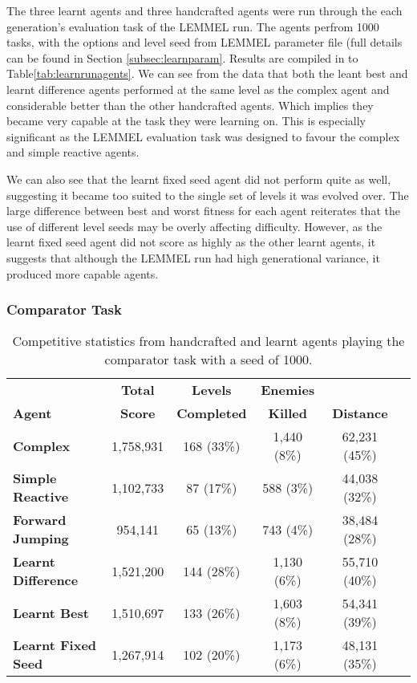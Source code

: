 The three learnt agents and three handcrafted agents were run through the each generation's evaluation task of the LEMMEL run. The agents perfrom 1000 tasks, with the options and level seed from LEMMEL parameter file (full details can be found in Section \ref{subsec:learnparam}. Results are compiled in to Table\ref{tab:learnrunagents}. We can see from the data that both the leant best and learnt difference agents performed at the same level as the complex agent and considerable better than the other handcrafted agents. Which implies they became very capable at the task they were learning on. This is especially significant as the LEMMEL evaluation task was designed to favour the complex and simple reactive agents.

We can also see that the learnt fixed seed agent did not perform quite as well, suggesting it became too suited to the single set of levels it was evolved over. The large difference between best and worst fitness for each agent reiterates that the use of different level seeds may be overly affecting difficulty. However, as the learnt fixed seed agent did not score as highly as the other learnt agents, it suggests that although the LEMMEL run had high generational variance, it produced more capable agents.

\subsubsection{Comparator Task}

\begin{table}
  \begin{adjustwidth}{-0cm}{-0cm}
  \begin{center} \small
    \begin{tabular}{ | l | c | c | c | c | c |}
    \hline
    & \textbf{Total} & \textbf{Levels} & \textbf{Enemies} & \Tstrut \\
    \textbf{Agent} & \textbf{Score} & \textbf{Completed} & \textbf{Killed} & \textbf{Distance} \Bstrut \\ \thickhline
    \textbf{Complex} & 1,758,931 & 168 (33\%) & 1,440 (8\%) & 62,231 (45\%) \\ \hline
    \textbf{Simple Reactive} & 1,102,733 & 87 (17\%) & 588 (3\%) & 44,038 (32\%) \\ \hline
    \textbf{Forward Jumping} & 954,141 & 65 (13\%) & 743 (4\%) & 38,484 (28\%) \\ \thickhline
    \textbf{Learnt Difference} & 1,521,200 & 144 (28\%) & 1,130 (6\%) & 55,710 (40\%) \\ \hline
    \textbf{Learnt Best} & 1,510,697 & 133 (26\%) & 1,603 (8\%) & 54,341 (39\%) \\ \hline
    \textbf{Learnt Fixed Seed} & 1,267,914 & 102 (20\%) & 1,173 (6\%) & 48,131 (35\%) \\ \hline
    \end{tabular}
  \end{center}
  \end{adjustwidth}
  \caption{\small Competitive statistics from handcrafted and learnt agents playing the comparator task with a seed of 1000.}
  \label{tab:learnagentcomp}
\end{table}

